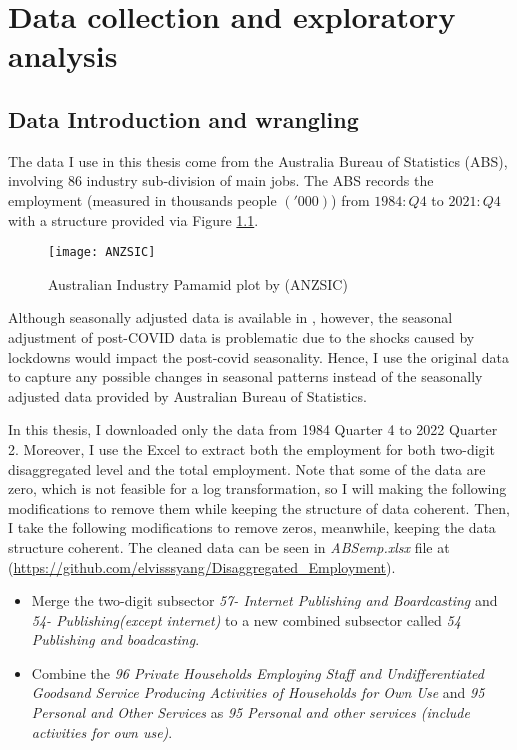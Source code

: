 \documentclass{monashthesis}
\begin{document}
\hypertarget{data-collection-and-exploratory-analysis}{%
\chapter{Data collection and exploratory analysis}\label{data-collection-and-exploratory-analysis}}

\hypertarget{data-introduction-and-wrangling}{%
\section{Data Introduction and wrangling}\label{data-introduction-and-wrangling}}

The data I use in this thesis come from the Australia Bureau of Statistics (ABS), involving 86 industry sub-division of main jobs. The ABS records the employment (measured in thousands people \(('000)\)) from \(1984:Q4\) to \(2021:Q4\) with a structure provided via Figure \ref{fig:anzsic}.

\graphicspath{ {/Users/elvisyang/Desktop/hon_proj/Disaggregated_Employment/Honours_thesis/figures} }

\begin{figure}[H]
\texttt{[image: ANZSIC]}
\centering
\caption{Australian Industry Pamamid plot by (ANZSIC)}
\label{fig:anzsic}
\end{figure}

Although seasonally adjusted data is available in \autocite{ABS2022}, however, the seasonal adjustment of post-COVID data is problematic due to the shocks caused by lockdowns would impact the post-covid seasonality. Hence, I use the original data to capture any possible changes in seasonal patterns instead of the seasonally adjusted data provided by Australian Bureau of Statistics.

In this thesis, I downloaded only the data from 1984 Quarter 4 to 2022 Quarter 2. Moreover, I use the Excel to extract both the employment for both two-digit disaggregated level and the total employment. Note that some of the data are zero, which is not feasible for a log transformation, so I will making the following modifications to remove them while keeping the structure of data coherent. Then, I take the following modifications to remove zeros, meanwhile, keeping the data structure coherent. The cleaned data can be seen in \emph{ABSemp.xlsx} file at (\url{https://github.com/elvisssyang/Disaggregated_Employment}).

\begin{itemize}
\item
  Merge the two-digit subsector \emph{57- Internet Publishing and Boardcasting} and \emph{54- Publishing(except internet)} to a new combined subsector called \emph{54 Publishing and boadcasting}.
\item
  Combine the \emph{96 Private Households Employing Staff and Undifferentiated Goodsand Service Producing Activities of Households for Own Use} and \emph{95 Personal and Other Services} as \emph{95 Personal and other services (include activities for own use)}.
\end{itemize}
\end{document}
